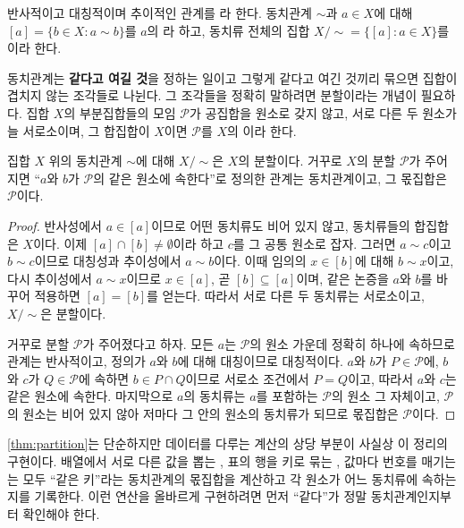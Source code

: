 \begin{definition}[동치관계]
\label{def:equivalence}
반사적이고 대칭적이며 추이적인 관계를 라 한다. 동치관계 $\sim$과 $a\in X$에 대해 $[a]=\{b\in X:a\sim b\}$를 $a$의 라 하고, 동치류 전체의 집합 $X/{\sim}=\{[a]:a\in X\}$를 이라 한다.
\end{definition}

동치관계는 \textbf{같다고 여길 것}을 정하는 일이고 그렇게 같다고 여긴 것끼리 묶으면 집합이 겹치지 않는 조각들로 나뉜다. 그 조각들을 정확히 말하려면 분할이라는 개념이 필요하다. 집합 $X$의 부분집합들의 모임 $\mathcal{P}$가 공집합을 원소로 갖지 않고, 서로 다른 두 원소가 늘 서로소이며, 그 합집합이 $X$이면 $\mathcal{P}$를 $X$의 이라 한다.

\begin{theorem}
\label{thm:partition}
집합 $X$ 위의 동치관계 $\sim$에 대해 $X/{\sim}$은 $X$의 분할이다. 거꾸로 $X$의 분할 $\mathcal{P}$가 주어지면 ``$a$와 $b$가 $\mathcal{P}$의 같은 원소에 속한다''로 정의한 관계는 동치관계이고, 그 몫집합은 $\mathcal{P}$이다.
\end{theorem}

\begin{proof}
반사성에서 $a\in[a]$이므로 어떤 동치류도 비어 있지 않고, 동치류들의 합집합은 $X$이다. 이제 $[a]\cap[b]\ne\emptyset$이라 하고 $c$를 그 공통 원소로 잡자. 그러면 $a\sim c$이고 $b\sim c$이므로 대칭성과 추이성에서 $a\sim b$이다. 이때 임의의 $x\in[b]$에 대해 $b\sim x$이고, 다시 추이성에서 $a\sim x$이므로 $x\in[a]$, 곧 $[b]\subseteq[a]$이며, 같은 논증을 $a$와 $b$를 바꾸어 적용하면 $[a]=[b]$를 얻는다. 따라서 서로 다른 두 동치류는 서로소이고, $X/{\sim}$은 분할이다.

거꾸로 분할 $\mathcal{P}$가 주어졌다고 하자. 모든 $a$는 $\mathcal{P}$의 원소 가운데 정확히 하나에 속하므로 관계는 반사적이고, 정의가 $a$와 $b$에 대해 대칭이므로 대칭적이다. $a$와 $b$가 $P\in\mathcal{P}$에, $b$와 $c$가 $Q\in\mathcal{P}$에 속하면 $b\in P\cap Q$이므로 서로소 조건에서 $P=Q$이고, 따라서 $a$와 $c$는 같은 원소에 속한다. 마지막으로 $a$의 동치류는 $a$를 포함하는 $\mathcal{P}$의 원소 그 자체이고, $\mathcal{P}$의 원소는 비어 있지 않아 저마다 그 안의 원소의 동치류가 되므로 몫집합은 $\mathcal{P}$이다.
\end{proof}

\cref{thm:partition}는 단순하지만 데이터를 다루는 계산의 상당 부분이 사실상 이 정리의 구현이다. 배열에서 서로 다른 값을 뽑는 , 표의 행을 키로 묶는 , 값마다 번호를 매기는 는 모두 ``같은 키''라는 동치관계의 몫집합을 계산하고 각 원소가 어느 동치류에 속하는지를 기록한다. 이런 연산을 올바르게 구현하려면 먼저 ``같다''가 정말 동치관계인지부터 확인해야 한다.

